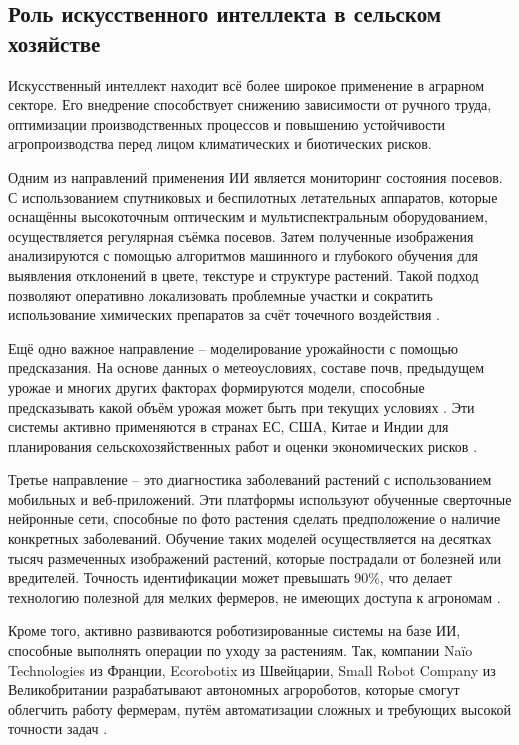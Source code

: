 \subsection{Роль искусственного интеллекта в сельском хозяйстве}
Искусственный интеллект находит всё более широкое применение в аграрном секторе. Его внедрение способствует снижению зависимости от ручного труда, оптимизации производственных процессов и повышению устойчивости агропроизводства перед лицом климатических и биотических рисков.

Одним из направлений применения ИИ является мониторинг состояния посевов. С использованием спутниковых и беспилотных летательных аппаратов, которые оснащённы высокоточным оптическим и мультиспектральным оборудованием, осуществляется регулярная съёмка посевов. Затем полученные изображения анализируются с помощью алгоритмов машинного и глубокого обучения для выявления отклонений в цвете, текстуре и структуре растений. Такой подход позволяют оперативно локализовать проблемные участки и сократить использование химических препаратов за счёт точечного воздействия \cite{vkr2}.

Ещё одно важное направление -- моделирование урожайности с помощью предсказания. На основе данных о метеоусловиях, составе почв, предыдущем урожае и многих других факторах формируются модели, способные предсказывать какой объём урожая может быть при текущих условиях . Эти системы активно применяются в странах ЕС, США, Китае и Индии для планирования сельскохозяйственных работ и оценки экономических рисков \cite{vkr1}.

Третье направление -- это диагностика заболеваний растений с использованием мобильных и веб-приложений. Эти платформы используют обученные сверточные нейронные сети, способные по фото растения сделать предположение о наличие конкретных заболеваний. Обучение таких моделей осуществляется на десятках тысяч размеченных изображений растений, которые пострадали от болезней или вредителей. Точность идентификации может превышать 90\%, что делает технологию полезной для мелких фермеров, не имеющих доступа к агрономам \cite{vkr3}.

Кроме того, активно развиваются роботизированные системы на базе ИИ, способные выполнять операции по уходу за растениям. Так, компании Naïo Technologies из Франции, Ecorobotix из Швейцарии, Small Robot Company из Великобритании разрабатывают автономных агророботов, которые смогут облегчить работу фермерам, путём автоматизации сложных и требующих высокой точности задач \cite{plant4}.


